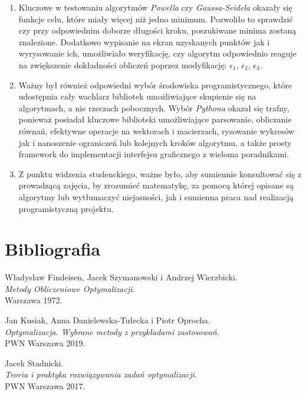 \documentclass[a4paper,12pt]{article}
\begin{document}
\begin{enumerate}
    \item Kluczowe w testowaniu algorytmów \textit{Powella} czy \textit{Gaussa-Seidela} okazały się funkcje celu, które miały więcej niż jedno minimum. Pozwoliło to sprawdzić czy przy odpowiednim doborze długości kroku, poszukiwane minima zostaną znalezione. Dodatkowo wypisanie na ekran uzyskanych punktów jak i wyrysowanie ich, umożliwiało weryfikację, czy algorytm odpowiednio reaguje na zwiększenie dokładności obliczeń poprzez modyfikację: $\epsilon_{1}$, $\epsilon_{2}$, $\epsilon_{3}$.
    
    \item Ważny był również odpowiedni wybór środowiska programistycznego, które udostępnia cały wachlarz bibliotek umożliwiające skupienie się na algorytmach, a nie rzeczach pobocznych. Wybór \textit{Pythona} okazał się trafny, ponieważ posiadał kluczowe biblioteki umożliwiające parsowanie, obliczanie równań, efektywne operacje na wektorach i macierzach, rysowanie wykresów jak i nanoszenie ograniczeń lub kolejnych kroków algorytmu, a także prosty framework do implementacji interfejsu graficznego z wieloma poradnikami.
    
    \item Z punktu widzenia studenckiego, ważne było, aby sumiennie konsultować się z prowadzącą zajęcia, by zrozumieć matematykę, za pomocą której opisane są algorytmy lub wytłumaczyć niejasności, jak i sumienna praca nad realizacją programistyczną projektu.
\end{enumerate}

\newpage
\section{Bibliografia}
\begin{thebibliography}{3}
    Władysław Findeisen, Jacek Szymanowski i Andrzej Wierzbicki. \\
    \textit{Metody Obliczeniowe Optymalizacji}. \\
    Warszawa 1972.
    
    Jan Kusiak, Anna Danielewska-Tułecka i Piotr Oprocha. \\
    \textit{Optymalizacja. Wybrane metody z przykładami zastosowań.} \\
    PWN Warszawa 2019.
    
    Jacek Stadnicki. \\
    \textit{Teoria i praktyka rozwiązywania zadań optymalizacji.} \\
    PWN Warszawa 2017.
\end{thebibliography}
\end{document}
